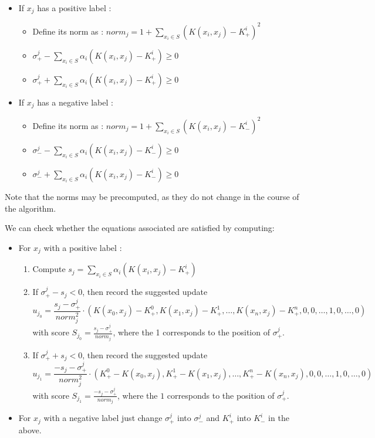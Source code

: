 \documentclass[a4paper,twoside,10pt]{report}
\begin{document}
	\begin{itemize}
		\item If \(x_j\) has a positive label : 
			\begin{itemize}
				\item Define its norm as : \(norm_j = 1 + \sum_{x_i\in S} {(K(x_i, x_j) - K^i_+)^2}\)
				\item \(\sigma^j_+ - \sum_{x_i\in S} {\alpha_i (K(x_i, x_j) - K^i_+)} \geq 0\)
				\item \(\sigma^j_+ + \sum_{x_i\in S} {\alpha_i (K(x_i, x_j) - K^i_+)} \geq 0\)
			\end{itemize}
			
		\item If \(x_j\) has a negative label : 
			\begin{itemize}
				\item Define its norm as : \(norm_j = 1 + \sum_{x_i\in S} {(K(x_i, x_j) - K^i_-)^2}\)
				\item \(\sigma^j_- - \sum_{x_i\in S} {\alpha_i (K(x_i, x_j) - K^i_-)} \geq 0\)
				\item \(\sigma^j_- + \sum_{x_i\in S} {\alpha_i (K(x_i, x_j) - K^i_-)} \geq 0\)
			\end{itemize}			
	\end{itemize}
	
	Note that the norms may be precomputed, as they do not change in the course of the algorithm.
	
	
	We can check whether the equations associated are satisfied by computing:
	
	\begin{itemize}
		\item For \(x_j\) with a positive label : 
			\begin{enumerate}
				\item Compute \(s_j = \sum_{x_i\in S} {\alpha_i (K(x_i, x_j) - K^i_+)}\)
				\item If \(\sigma^j_+ - s_j < 0\), then record the suggested update 
							\[u_{j_0} = \frac{s_j - \sigma^j_+}{norm_j^2} \cdot (K(x_0, x_j) - K^0_+, K(x_1, x_j) - K^1_+, \ldots, K(x_n, x_j) - K^n_+, 0, 0, \ldots, 1, 0, \ldots, 0)\]							
							with score \(S_{j_0} = \frac{s_j - \sigma^j_+}{norm_j}\), where the 1 corresponds to the position of \(\sigma^j_+\).
							
				\item If \(\sigma^j_+ + s_j < 0\), then record the suggested update 
							\[u_{j_1} = \frac{- s_j - \sigma^j_+}{norm_j^2} \cdot (K^0_+ - K(x_0, x_j), K^1_+ - K(x_1, x_j), \ldots, K^n_+ - K(x_n, x_j), 0, 0, \ldots, 1, 0, \ldots, 0)\]
							with score \(S_{j_1} = \frac{- s_j - \sigma^j_+}{norm_j}\), where the \(1\) corresponds to the position of \(\sigma^j_+\).
			\end{enumerate}
			
		\item For \(x_j\) with a negative label just change \(\sigma^j_+\) into \(\sigma^j_-\) and \(K^i_+\) into \(K^i_-\) in the above.
	\end{itemize}
	
\end{document}
